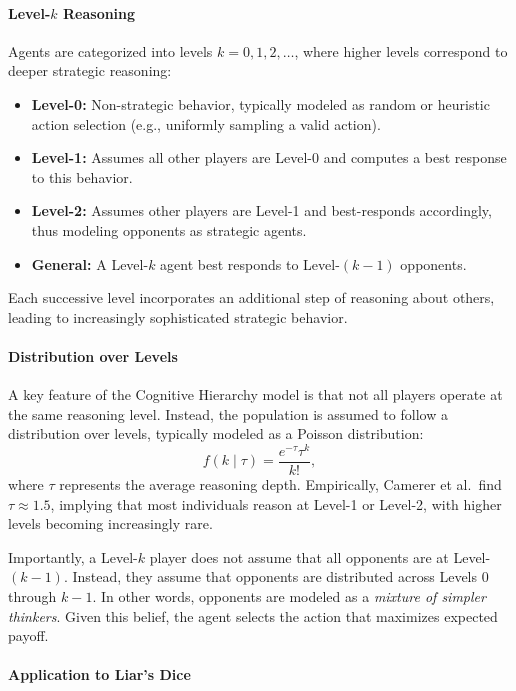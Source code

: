 \documentclass{article}
\begin{document}
\paragraph{Level-$k$ Reasoning}

Agents are categorized into levels $k = 0, 1, 2, \dots$, where higher levels correspond to deeper strategic reasoning:
\begin{itemize}
    \item \textbf{Level-0:} Non-strategic behavior, typically modeled as random or heuristic action selection (e.g., uniformly sampling a valid action).
    \item \textbf{Level-1:} Assumes all other players are Level-0 and computes a best response to this behavior.
    \item \textbf{Level-2:} Assumes other players are Level-1 and best-responds accordingly, thus modeling opponents as strategic agents.
    \item \textbf{General:} A Level-$k$ agent best responds to Level-$(k-1)$ opponents.
\end{itemize}

Each successive level incorporates an additional step of reasoning about others, leading to increasingly sophisticated strategic behavior.

\paragraph{Distribution over Levels}

A key feature of the Cognitive Hierarchy model is that not all players operate at the same reasoning level. Instead, the population is assumed to follow a distribution over levels, typically modeled as a Poisson distribution:
\[
f(k \mid \tau) = \frac{e^{-\tau} \tau^k}{k!},
\]
where $\tau$ represents the average reasoning depth. Empirically, Camerer et al.\ find $\tau \approx 1.5$, implying that most individuals reason at Level-1 or Level-2, with higher levels becoming increasingly rare.

Importantly, a Level-$k$ player does not assume that all opponents are at Level-$(k-1)$. Instead, they assume that opponents are distributed across Levels $0$ through $k-1$. In other words, opponents are modeled as a \textit{mixture of simpler thinkers}. Given this belief, the agent selects the action that maximizes expected payoff.

\paragraph{Application to Liar's Dice}
\end{document}
